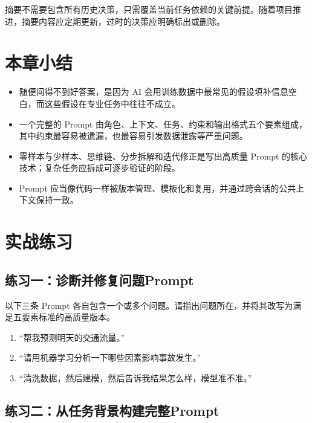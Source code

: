 摘要不需要包含所有历史决策，只需覆盖当前任务依赖的关键前提。随着项目推进，摘要内容应定期更新，过时的决策应明确标出或删除。

\section{本章小结}

\begin{itemize}
  \item 随便问得不到好答案，是因为 AI 会用训练数据中最常见的假设填补信息空白，而这些假设在专业任务中往往不成立。
  \item 一个完整的 Prompt 由角色、上下文、任务、约束和输出格式五个要素组成，其中约束最容易被遗漏，也最容易引发数据泄露等严重问题。
  \item 零样本与少样本、思维链、分步拆解和迭代修正是写出高质量 Prompt 的核心技术；复杂任务应拆成可逐步验证的阶段。
  \item Prompt 应当像代码一样被版本管理、模板化和复用，并通过跨会话的公共上下文保持一致。
\end{itemize}

\section{实战练习}

\subsection*{练习一：诊断并修复问题Prompt}

以下三条 Prompt 各自包含一个或多个问题。请指出问题所在，并将其改写为满足五要素标准的高质量版本。

\begin{enumerate}
  \item“帮我预测明天的交通流量。”
  \item“请用机器学习分析一下哪些因素影响事故发生。”
  \item“清洗数据，然后建模，然后告诉我结果怎么样，模型准不准。”
\end{enumerate}

\subsection*{练习二：从任务背景构建完整Prompt}

